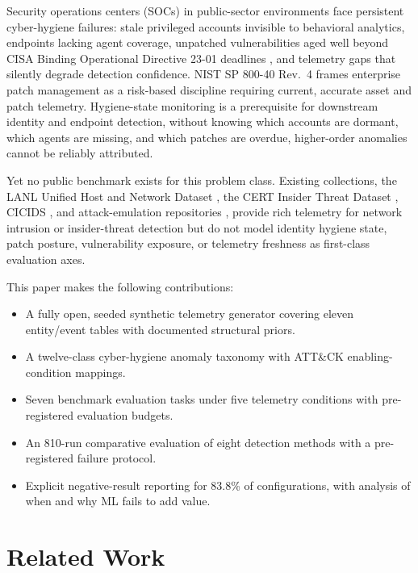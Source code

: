 \documentclass[conference]{IEEEtran}
\begin{document}
Security operations centers (SOCs) in public-sector environments face persistent
cyber-hygiene failures: stale privileged accounts invisible to behavioral analytics,
endpoints lacking agent coverage, unpatched vulnerabilities aged well beyond CISA
Binding Operational Directive 23-01 deadlines \cite{cisa_bod2301_2022}, and
telemetry gaps that silently degrade detection confidence. NIST SP 800-40 Rev.\ 4
\cite{nist_sp800_40} frames enterprise patch management as a risk-based discipline
requiring current, accurate asset and patch telemetry. Hygiene-state monitoring
is a prerequisite for downstream identity and endpoint detection, without knowing
which accounts are dormant, which agents are missing, and which patches are overdue,
higher-order anomalies cannot be reliably attributed.

Yet no public benchmark exists for this problem class. Existing collections, the
LANL Unified Host and Network Dataset \cite{kent2015lanl}, the CERT Insider Threat
Dataset \cite{glasser2013cert}, CICIDS \cite{sharafaldin2018cicids}, and
attack-emulation repositories \cite{rodriguez2019mordor}, provide rich telemetry
for network intrusion or insider-threat detection but do not model identity hygiene
state, patch posture, vulnerability exposure, or telemetry freshness as first-class
evaluation axes.

This paper makes the following contributions:
\begin{itemize}[leftmargin=*,noitemsep,topsep=2pt]
  \item[\textbf{C1}] A fully open, seeded synthetic telemetry generator covering
    eleven entity/event tables with documented structural priors.
  \item[\textbf{C2}] A twelve-class cyber-hygiene anomaly taxonomy with
    ATT\&CK enabling-condition mappings.
  \item[\textbf{C3}] Seven benchmark evaluation tasks under five telemetry
    conditions with pre-registered evaluation budgets.
  \item[\textbf{C4}] An 810-run comparative evaluation of eight detection methods
    with a pre-registered failure protocol.
  \item[\textbf{C5}] Explicit negative-result reporting for 83.8\% of
    configurations, with analysis of when and why ML fails to add value.
\end{itemize}

\section{Related Work}
\label{sec:related}
\end{document}
